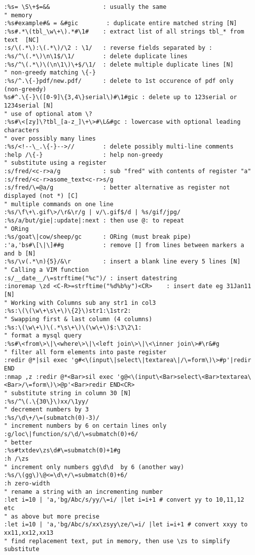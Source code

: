 \documentclass[10pt,landscape]{article}
\begin{document}
\begin{multicols}{2}
\begin{verbatim}
:%s= \S\+$=&&               : usually the same
" memory
:%s#example#& = &#gic        : duplicate entire matched string [N]
:%s#.*\(tbl_\w\+\).*#\1#    : extract list of all strings tbl_* from text  [NC]
:s/\(.*\):\(.*\)/\2 : \1/   : reverse fields separated by :
:%s/^\(.*\)\n\1$/\1/        : delete duplicate lines
:%s/^\(.*\)\(\n\1\)\+$/\1/  : delete multiple duplicate lines [N]
" non-greedy matching \{-}
:%s/^.\{-}pdf/new.pdf/      : delete to 1st occurence of pdf only (non-greedy)
%s#^.\{-}\([0-9]\{3,4\}serial\)#\1#gic : delete up to 123serial or 1234serial [N]
" use of optional atom \?
:%s#\<[zy]\?tbl_[a-z_]\+\>#\L&#gc : lowercase with optional leading characters
" over possibly many lines
:%s/<!--\_.\{-}-->//        : delete possibly multi-line comments
:help /\{-}                 : help non-greedy
" substitute using a register
:s/fred/<c-r>a/g            : sub "fred" with contents of register "a"
:s/fred/<c-r>asome_text<c-r>s/g  
:s/fred/\=@a/g              : better alternative as register not displayed (not *) [C]
" multiple commands on one line
:%s/\f\+\.gif\>/\r&\r/g | v/\.gif$/d | %s/gif/jpg/
:%s/a/but/gie|:update|:next : then use @: to repeat
" ORing
:%s/goat\|cow/sheep/gc      : ORing (must break pipe)
:'a,'bs#\[\|\]##g           : remove [] from lines between markers a and b [N]
:%s/\v(.*\n){5}/&\r         : insert a blank line every 5 lines [N]
" Calling a VIM function
:s/__date__/\=strftime("%c")/ : insert datestring
:inoremap \zd <C-R>=strftime("%d%b%y")<CR>    : insert date eg 31Jan11 [N]
" Working with Columns sub any str1 in col3
:%s:\(\(\w\+\s\+\)\{2}\)str1:\1str2:
" Swapping first & last column (4 columns)
:%s:\(\w\+\)\(.*\s\+\)\(\w\+\)$:\3\2\1:
" format a mysql query 
:%s#\<from\>\|\<where\>\|\<left join\>\|\<\inner join\>#\r&#g
" filter all form elements into paste register
:redir @*|sil exec 'g#<\(input\|select\|textarea\|/\=form\)\>#p'|redir END
:nmap ,z :redir @*<Bar>sil exec 'g@<\(input\<Bar>select\<Bar>textarea\<Bar>/\=form\)\>@p'<Bar>redir END<CR>
" substitute string in column 30 [N]
:%s/^\(.\{30\}\)xx/\1yy/
" decrement numbers by 3
:%s/\d\+/\=(submatch(0)-3)/
" increment numbers by 6 on certain lines only
:g/loc\|function/s/\d/\=submatch(0)+6/
" better
:%s#txtdev\zs\d#\=submatch(0)+1#g
:h /\zs
" increment only numbers gg\d\d  by 6 (another way)
:%s/\(gg\)\@<=\d\+/\=submatch(0)+6/
:h zero-width
" rename a string with an incrementing number
:let i=10 | 'a,'bg/Abc/s/yy/\=i/ |let i=i+1 # convert yy to 10,11,12 etc
" as above but more precise
:let i=10 | 'a,'bg/Abc/s/xx\zsyy\ze/\=i/ |let i=i+1 # convert xxyy to xx11,xx12,xx13
" find replacement text, put in memory, then use \zs to simplify substitute

\end{verbatim}
\end{multicols}
\end{document}
